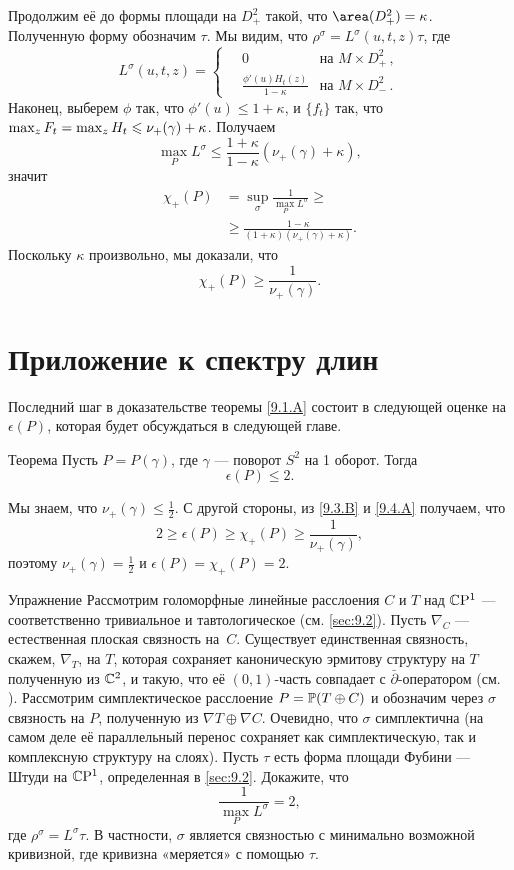 Продолжим её до формы площади на $D_+^2$ такой, что $\area (D_+^2) = \kappa$.
Полученную форму обозначим $\tau$.
Мы видим, что $\rho^\sigma = L^\sigma (u, t, z)\tau$, где 
\[
L^\sigma(u,t,z)=
\begin{cases}
\quad0&\text{на\ } M\times D^2_+\,,
\\
\quad\frac{\phi'(u)H_t(z)}{1-\kappa}&\text{на\ } M\times D^2_-\,.
\end{cases}
\]
Наконец, выберем $\phi$ так, что $\phi' (u) \le 1 + \kappa$, и
$\{f_t\}$ так, что $\max_z F_t \z= \max_z H_t \le \nu_+ (\gamma) +
\kappa$. 
Получаем
\[\max_P L^\sigma \le  \frac{1+\kappa}{1-\kappa} (\nu_+ (\gamma) + \kappa),\]
значит 
\begin{align*}
\chi_+ (P) &= \sup_\sigma \frac1{\max_PL^\sigma}\ge
\\
&\ge\frac{1-\kappa}{(1 + \kappa)(\nu_+ (\gamma) + \kappa)}. 
\end{align*}
Поскольку $\kappa$ произвольно, мы доказали, что 
\[\chi_+ (P) \ge \frac{1}{\nu_+ (\gamma)}.\]
\qeds

\section{Приложение к спектру длин}\label{sec:9.4}

Последний шаг в доказательстве теоремы \ref{9.1.A} состоит в следующей
оценке на $\epsilon(P)$, которая будет обсуждаться в следующей главе.


\begin{thm}{Теорема}\label{9.4.A}
Пусть $P = P(\gamma)$, где $\gamma$ — поворот $S^2$ на 1 оборот.
Тогда
\[\epsilon(P) \le 2.\]
\end{thm}

Мы знаем, что $\nu_+ (\gamma) \le \tfrac12$.
С другой стороны, из \ref{9.3.B} и \ref{9.4.A} получаем, что
\[2 \ge \epsilon(P) \ge \chi_+ (P) \ge\frac1{\nu_+(\gamma)},\]
поэтому $\nu_+ (\gamma) = \tfrac12$ и $\epsilon(P) = \chi_+ (P) = 2$.
\qeds

\begin{ex}{Упражнение}
Рассмотрим голоморфные линейные расслоения $C$ и $T$ над $\mathbb{C}\mathrm{P}^1$ —
соответственно тривиальное и тавтологическое (см. \ref{sec:9.2}). 
Пусть $\nabla_C$ — естественная плоская связность на~$C$.
Существует единственная связность, скажем, $\nabla_T$, на $T$, которая
сохраняет каноническую эрмитову структуру  на $T$ полученную из
$\mathbb{C}^2$, и такую, что её $(0,1)$-часть совпадает с
$\bar\partial$-оператором (см. \cite{GH}). 
Рассмотрим симплектическое расслоение $P = \mathbb{P}(T \oplus C)$ и
обозначим через $\sigma$ связность на $P$, полученную из $\nabla T
\oplus \nabla C$. 
Очевидно, что $\sigma$ симплектична (на самом деле её параллельный
перенос сохраняет как симплектическую, так и комплексную структуру на
слоях). 
Пусть $\tau$ есть форма площади Фубини — Штуди на $\mathbb{C}\mathrm{P}^1$,
определенная в \ref{sec:9.2}. 
Докажите, что 
\[\frac1{\max_P L^\sigma}=2,\]
где $\rho^\sigma = L^\sigma \tau$.
В частности, $\sigma$ является связностью с минимально возможной
кривизной, где кривизна «меряется» с  помощью $\tau$.  
\end{ex}
